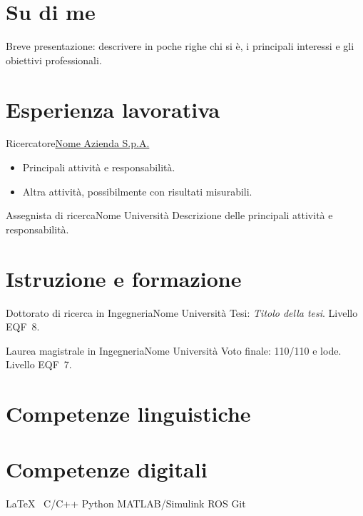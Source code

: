 \documentclass[italian,a4paper,10pt]{europecv2020}
\begin{document}
\ecvpersonalinfo

\section{Su di me}
Breve presentazione: descrivere in poche righe chi si è, i principali
interessi e gli obiettivi professionali.

\section{Esperienza lavorativa}

  {Ricercatore}{\href{https://www.azienda.it}{Nome Azienda S.p.A.}}
\begin{itemize}
  \item Principali attività e responsabilità.
  \item Altra attività, possibilmente con risultati misurabili.
\end{itemize}

  {Assegnista di ricerca}{Nome Università}
Descrizione delle principali attività e responsabilità.

\section{Istruzione e formazione}

  {Dottorato di ricerca in Ingegneria}{Nome Università}
Tesi: \emph{Titolo della tesi}. Livello EQF~8.

  {Laurea magistrale in Ingegneria}{Nome Università}
Voto finale: 110/110 e lode. Livello EQF~7.

\section{Competenze linguistiche}

\ecvlanguageheader{}
\ecvlanguagefooter{}

\section{Competenze digitali}
\LaTeX\ \textbar{} C/C++ \textbar{} Python \textbar{} MATLAB/Simulink \textbar{} ROS \textbar{} Git
\end{document}
